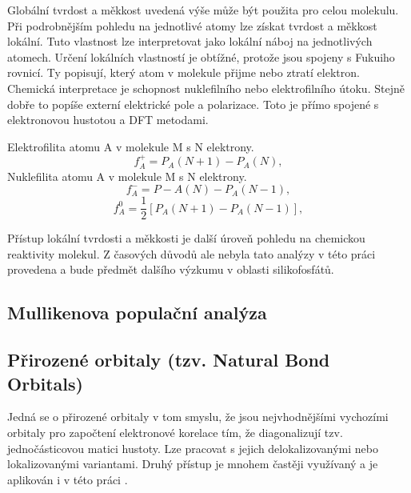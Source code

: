 \documentclass[
  digital, %
  table,   %
  lof,     %
  lot,     %
  oneside,
]{fithesis3}
\begin{document}
Globální tvrdost a měkkost uvedená výše může být použita pro celou molekulu. Při podrobnějším pohledu na jednotlivé atomy lze získat tvrdost a měkkost lokální. Tuto vlastnost lze interpretovat jako lokální náboj na jednotlivých atomech. Určení lokálních vlastností je obtížné, protože jsou spojeny s Fukuiho rovnicí. Ty popisují, který atom v molekule přijme nebo ztratí elektron. Chemická interpretace je schopnost nuklefilního nebo elektrofilního útoku. Stejně dobře to popíše externí elektrické pole a polarizace. Toto je přímo spojené s elektronovou hustotou a DFT metodami.

Elektrofilita atomu A v molekule M s N elektrony.
\begin{equation}
f_A^+ = P_A(N+1) - P_A(N),
\end{equation}
Nuklefilita atomu A v molekule M s N elektrony.
\begin{equation}
f_A^- = P-A(N) - P_A(N-1),
\end{equation}
\begin{equation}
f_A^0 = \frac{1}{2}[P_A(N+1) - P_A(N-1)],
\end{equation}

Přístup lokální tvrdosti a měkkosti je další úroveň pohledu na chemickou reaktivity molekul. Z časových důvodů ale nebyla tato analýzy v této práci provedena a bude předmět dalšího výzkumu v oblasti silikofosfátů.

\subsection{Mullikenova populační analýza}

\subsection{Přirozené orbitaly (tzv. Natural Bond Orbitals)}
Jedná se o přirozené orbitaly v tom smyslu, že jsou nejvhodnějšími vychozími orbitaly pro započtení elektronové korelace tím, že diagonalizují tzv. jednočásticovou matici hustoty. Lze pracovat s jejich delokalizovanými nebo lokalizovanými variantami. Druhý přístup je mnohem častěji využívaný a je aplikován i v této práci \cite{weinhold2005valency}.
\end{document}
